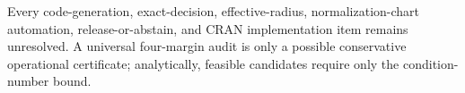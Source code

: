 Every code-generation, exact-decision, effective-radius, normalization-chart automation, release-or-abstain, and CRAN implementation item remains unresolved. A universal four-margin audit is only a possible conservative operational certificate; analytically, feasible candidates require only the condition-number bound.